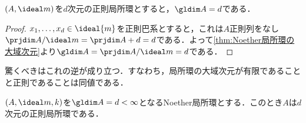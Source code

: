 \begin{thm}
	$(A,\ideal m)$を$d$次元の正則局所環とすると，$\gldim A=d$である．
\end{thm}

\begin{proof}
	$x_1,\dots,x_d\in\ideal{m}$を正則巴系とすると，これは$A$正則列をなし$\prjdim A/\ideal m=\prjdim A+d=d$である．よって\ref{thm:Noether局所環の大域次元}より$\gldim A=\prjdim A/\ideal m=d$である．
\end{proof}

驚くべきはこれの逆が成り立つ．すなわち，局所環の大域次元が有限であることと正則であることは同値である．

\begin{thm}[Serre]
	$(A,\ideal m,k)$を$\gldim A=d<\infty$となるNoether局所環とする．このとき$A$は$d$次元の正則局所環である．
\end{thm}

